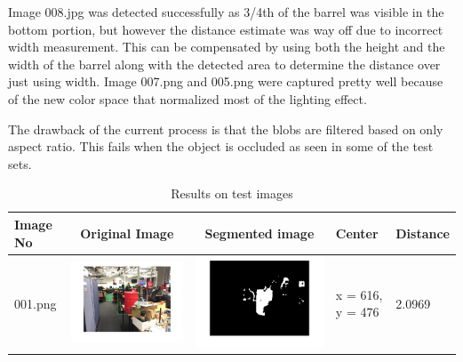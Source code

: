 \documentclass[fleqn,10pt]{SelfArx} %
\begin{document}
Image 008.jpg was detected successfully as 3/4th of the barrel was visible in the bottom portion, but however the distance estimate was way off due to incorrect width measurement. This can be compensated by using both the height and the width of the barrel along with the detected area to determine the distance over just using width. 
Image 007.png and 005.png were captured pretty well because of the new color space that normalized most of the lighting effect.

The drawback of the current process is that the blobs are filtered based on only aspect ratio. This fails when the object is occluded as seen in some of the test sets. 

\begin{table}
\caption{Results on test images}
\centering
\begin{tabular}{>{\centering\arraybackslash}M{15mm}cc>{\centering\arraybackslash}M{11mm}>{\centering\arraybackslash}M{15mm}}
\hline 
Image No & Original Image & Segmented image & Center & Distance \\ 
\hline 
\vspace{-4cm}001.png & \includegraphics[trim={3cm 2cm 3cm 2cm},clip,scale=0.28]{results/001.jpg} & \includegraphics[trim={3cm 2cm 3cm 2cm},clip,scale=0.28]{results/001s.jpg} & \vspace{-4cm} x = 616, y = 476 & \vspace{-4cm}2.0969 \\ 

\end{tabular}
\end{table}
\end{document}
